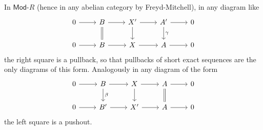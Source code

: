 \begin{rem}
	In $\mathsf{Mod}\text{-}R$ (hence in any abelian category by
	Freyd-Mitchell), in any diagram like
	\begin{equation}
	\begin{tikzcd}
		0 \arrow[r, "", rightarrow] &
		B \arrow[r, "", rightarrow] \arrow[d, "", equal] &
		X' \arrow[r, "", rightarrow] \arrow[d, "", rightarrow] &
		A' \arrow[r, "", rightarrow] \arrow[d, "\gamma", rightarrow] &
		0\\
		0 \arrow[r, "", rightarrow] &
		B \arrow[r, "", rightarrow] &
		X \arrow[r, "", rightarrow] &
		A \arrow[r, "", rightarrow] &
		0
	\end{tikzcd}
	\end{equation} 
	the right square is a pullback, so that pullbacks of
	short exact sequences are the only diagrams of this form.
	Analogously in any diagram of the form
	\begin{equation}
	\begin{tikzcd}
		0 \arrow[r, "", rightarrow] &
		B \arrow[r, "", rightarrow] \arrow[d, "\beta", rightarrow] &
		X \arrow[r, "", rightarrow] \arrow[d, "", rightarrow] &
		A \arrow[r, "", rightarrow] \arrow[d, "", equal] &
		0\\
		0 \arrow[r, "", rightarrow] &
		B' \arrow[r, "", rightarrow] &
		X' \arrow[r, "", rightarrow] &
		A \arrow[r, "", rightarrow] &
		0
	\end{tikzcd}
	\end{equation} 
	the left square is a pushout.
\end{rem}

